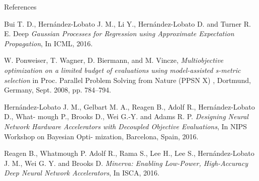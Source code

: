 \documentclass[final]{beamer}
\newlength{\onecolwid}
\begin{document}
\begin{frame}[t]
\begin{columns}[t]
\begin{column}{\onecolwid}

\begin{alertblock}{References}

\small
\begin{thebibliography}{9}
Bui T. D., Hern\'andez-Lobato J. M., Li Y., Hern\'andez-Lobato D. and Turner R. E. Deep
\textit{Gaussian Processes for Regression using Approximate Expectation Propagation}, In ICML,
2016.
 
W. Ponweiser, T. Wagner, D. Biermann, and M. Vincze,  
\textit{Multiobjective optimization on a limited budget of evaluations using model-assisted s-metric selection} in Proc. Parallel Problem Solving from Nature (PPSN X) , Dortmund, Germany, Sept. 2008, pp. 784–794. 

Hern\'andez-Lobato J. M., Gelbart M. A., Reagen B., Adolf R., Hern\'andez-Lobato D., What-
mough P., Brooks D., Wei G.-Y. and Adams R. P. \textit{Designing Neural Network Hardware
Accelerators with Decoupled Objective Evaluations}, In NIPS Workshop on Bayesian Opti-
mization, Barcelona, Spain, 2016.

Reagen B., Whatmough P. Adolf R., Rama S., Lee H., Lee S., Hern\'andez-Lobato J. M., Wei
G. Y. and Brooks D. \textit{Minerva: Enabling Low-Power, High-Accuracy Deep Neural Network
Accelerators}, In ISCA, 2016.
\end{thebibliography}

\end{alertblock}



\end{column} %

\end{columns} %

\end{frame} %
\end{document}
